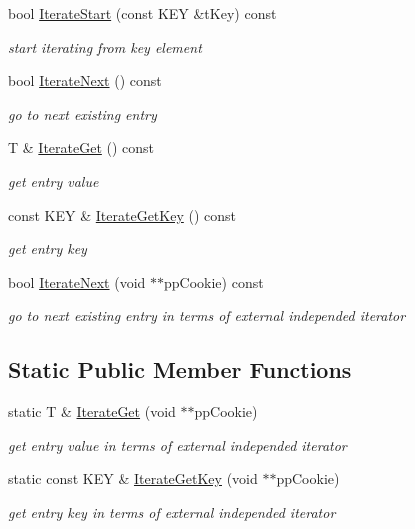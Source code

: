 \begin{DoxyCompactItemize}
bool \hyperlink{classCSphOrderedHash_aa3ee203023560373cff15977321e63b4}{Iterate\-Start} (const K\-E\-Y \&t\-Key) const 
\begin{DoxyCompactList}\small\item\em start iterating from key element \end{DoxyCompactList}\item 
bool \hyperlink{classCSphOrderedHash_a882b1c735dbf4c6d6809a8449ecd4678}{Iterate\-Next} () const 
\begin{DoxyCompactList}\small\item\em go to next existing entry \end{DoxyCompactList}\item 
T \& \hyperlink{classCSphOrderedHash_aef8d1c1028bcc660932c9ccf0d42d988}{Iterate\-Get} () const 
\begin{DoxyCompactList}\small\item\em get entry value \end{DoxyCompactList}\item 
const K\-E\-Y \& \hyperlink{classCSphOrderedHash_a6caf5243246b640042b76e6f3e9fadc7}{Iterate\-Get\-Key} () const 
\begin{DoxyCompactList}\small\item\em get entry key \end{DoxyCompactList}\item 
bool \hyperlink{classCSphOrderedHash_a88ff99487a8766c4720d36836a19ebcd}{Iterate\-Next} (void $\ast$$\ast$pp\-Cookie) const 
\begin{DoxyCompactList}\small\item\em go to next existing entry in terms of external independed iterator \end{DoxyCompactList}\end{DoxyCompactItemize}
\subsection*{Static Public Member Functions}
\begin{DoxyCompactItemize}
\item 
static T \& \hyperlink{classCSphOrderedHash_aa104dfb302b6e6aeb987baf3b616159d}{Iterate\-Get} (void $\ast$$\ast$pp\-Cookie)
\begin{DoxyCompactList}\small\item\em get entry value in terms of external independed iterator \end{DoxyCompactList}\item 
static const K\-E\-Y \& \hyperlink{classCSphOrderedHash_a3405cde1ba7d6ed96d83c047079130ad}{Iterate\-Get\-Key} (void $\ast$$\ast$pp\-Cookie)
\begin{DoxyCompactList}\small\item\em get entry key in terms of external independed iterator \end{DoxyCompactList}\end{DoxyCompactItemize}
